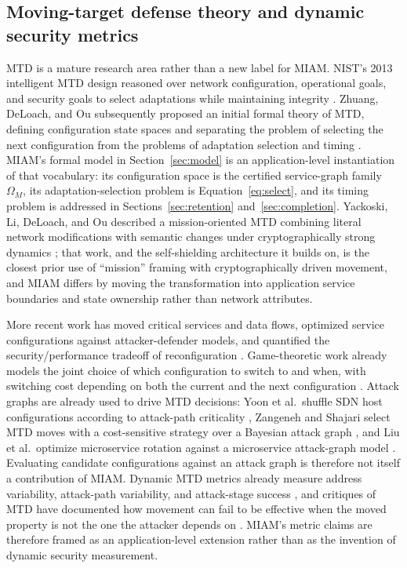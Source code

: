 \documentclass[11pt,letterpaper]{article}
\begin{document}
\subsection{Moving-target defense theory and dynamic security metrics}

MTD is a mature research area rather than a new label for MIAM. NIST's 2013 intelligent MTD design reasoned over network configuration, operational goals, and security goals to select adaptations while maintaining integrity \cite{zhuang2013}. Zhuang, DeLoach, and Ou subsequently proposed an initial formal theory of MTD, defining configuration state spaces and separating the problem of selecting the next configuration from the problems of adaptation selection and timing \cite{zhuang2014theory}. MIAM's formal model in Section~\ref{sec:model} is an application-level instantiation of that vocabulary: its configuration space is the certified service-graph family $\Omega_M$, its adaptation-selection problem is Equation~\eqref{eq:select}, and its timing problem is addressed in Sections~\ref{sec:retention} and~\ref{sec:completion}. Yackoski, Li, DeLoach, and Ou described a mission-oriented MTD combining literal network modifications with semantic changes under cryptographically strong dynamics \cite{yackoski2013}; that work, and the self-shielding architecture it builds on, is the closest prior use of ``mission'' framing with cryptographically driven movement, and MIAM differs by moving the transformation into application service boundaries and state ownership rather than network attributes.

More recent work has moved critical services and data flows, optimized service configurations against attacker-defender models, and quantified the security/performance tradeoff of reconfiguration \cite{ergenc2023,alhozaimy2024}. Game-theoretic work already models the joint choice of which configuration to switch to and when, with switching cost depending on both the current and the next configuration \cite{li2020markov}. Attack graphs are already used to drive MTD decisions: Yoon et al.\ shuffle SDN host configurations according to attack-path criticality \cite{yoon2020}, Zangeneh and Shajari select MTD moves with a cost-sensitive strategy over a Bayesian attack graph \cite{zangeneh2018}, and Liu et al.\ optimize microservice rotation against a microservice attack-graph model \cite{liu2023}. Evaluating candidate configurations against an attack graph is therefore not itself a contribution of MIAM. Dynamic MTD metrics already measure address variability, attack-path variability, and attack-stage success \cite{sharma2020metrics}, and critiques of MTD have documented how movement can fail to be effective when the moved property is not the one the attacker depends on \cite{hobson2014}. MIAM's metric claims are therefore framed as an application-level extension rather than as the invention of dynamic security measurement.
\end{document}
